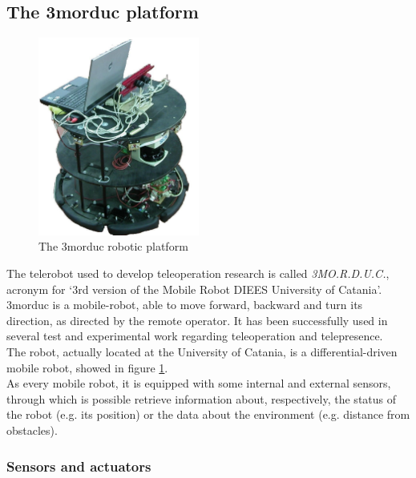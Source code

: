 \subsection{The 3morduc platform}
\label{sec:3morduc}

\begin{figure} [h]
  \begin{center}
    \includegraphics[width=150pt]{img/3morduc.jpg}
    \caption{The 3morduc robotic platform}
    \label{fig:morduc}
  \end{center}
\end{figure}

The telerobot used to develop teleoperation research is
called \textit{3MO.R.D.U.C.}, acronym for `3rd version of
the Mobile Robot DIEES University of Catania'.
3morduc is a mobile-robot, able to move forward, backward
and turn its direction, as directed by the remote operator.
It has been successfully used in several test and experimental
work regarding teleoperation and telepresence.
\\
The robot, actually located at the University of
Catania, is a differential-driven mobile robot, showed
in figure \ref{fig:morduc}.
\\
As every mobile robot, it is equipped with some internal
and external sensors, through which is possible retrieve
information about, respectively, the status of the robot
(e.g. its position) or the data about the environment (e.g.
distance from obstacles).

\subsubsection{Sensors and actuators}
\label{sec:3morduc:sensors_actuators}



